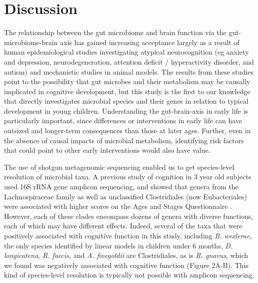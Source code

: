 \documentclass[a4paper]{article}
\begin{document}
\section*{Discussion}

The relationship between the gut microbiome and brain function via the
gut-microbiome-brain axis has gained increasing acceptance largely as a
result of human epidemiological studies investigating atypical
neurocognition (eg anxiety and depression, neurodegeneration, attention
deficit / hyperactivity disorder, and autism) and mechanistic studies in
animal models. The results from these studies point to the possibility
that gut microbes and their metabolism may be causally implicated in
cognitive development, but this study is the first to our knowledge that
directly investigates microbial species and their genes in relation to
typical development in young children. Understanding the gut-brain-axis
in early life is particularly important, since differences or
interventions in early life can have outsized and longer-term
consequences than those at later ages. Further, even in the absence of
causal impacts of microbial metabolism, identifying risk factors that
could point to other early interventions would also have value.

The use of shotgun metagenomic sequencing enabled us to get
species-level resolution of microbial taxa. A previous study of
cognition in 3 year old subjects used 16S rRNA gene amplicon sequencing,
and showed that genera from the Lachnospiraceae family as well as
unclassified Clostridiales (now Eubacteriales) were associated with
higher scores on the Ages and Stages Questionnaire
\citep{sordilloAssociationInfantGut2019}.
However, each of these clades encompass dozens of genera with
diverse functions, each of which may have different effects. Indeed,
several of the taxa that were positively associated with cognitive
function in this study, including \emph{B. wexlerae}, the only species
identified by linear models in children under 6 months, \emph{D.
longicatena}, \emph{R. faecis}, and \emph{A. finegoldii} are
Clostridiales, as is \emph{R. gnavus}, which we found was negatively
associated with cognitive function (Figure 2A-B). This kind of
species-level resolution is typically not possible with amplicon
sequencing.
\end{document}
